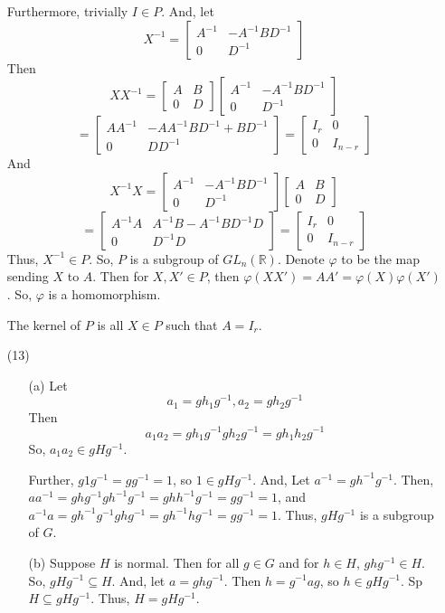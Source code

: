 \documentclass[12pt]{article}
\begin{document}
\begin{itemize}
Furthermore, trivially $I \in P$. And, let
$$X^{-1} = \begin{bmatrix}
A^{-1} & -A^{-1}BD^{-1}\\
0 & D^{-1}
\end{bmatrix}$$
Then
$$XX^{-1} = \begin{bmatrix}
A & B \\
0 & D
\end{bmatrix}\begin{bmatrix}
A^{-1} & -A^{-1}BD^{-1}\\
0 & D^{-1}
\end{bmatrix}$$
$$= \begin{bmatrix}
AA^{-1} & -AA^{-1}BD^{-1} + BD^{-1} \\
0 & DD^{-1} 
\end{bmatrix} = \begin{bmatrix}
I_r & 0 \\
0 & I_{n-r}
\end{bmatrix}$$
And
$$X^{-1}X = \begin{bmatrix}
A^{-1} & -A^{-1}BD^{-1}\\
0 & D^{-1}
\end{bmatrix}\begin{bmatrix}
A & B \\
0 & D
\end{bmatrix}$$
$$= \begin{bmatrix}
A^{-1}A & A^{-1}B - A^{-1}BD^{-1}D \\
0 & D^{-1}D
\end{bmatrix} = \begin{bmatrix}
I_r & 0 \\
0 & I_{n-r}
\end{bmatrix}$$
Thus, $X^{-1} \in P$. So, $P$ is a subgroup of $GL_n(\mathbb{R})$.
Denote $\varphi$ to be the map sending $X$ to $A$. Then for $X, X' \in P$, then $\varphi(XX') = AA' = \varphi(X)\varphi(X')$. So, $\varphi$ is a homomorphism.

The kernel of $P$ is all $X \in P$ such that $A = I_r$.
\item[(13)]
\begin{itemize}
\item[(a)]
Let
$$a_1 = gh_1g^{-1}, a_2 = gh_2g^{-1}$$
Then
$$a_1a_2 = gh_1g^{-1}gh_2g^{-1} = gh_1h_2g^{-1}$$
So, $a_1a_2 \in gHg^{-1}$. 

Further, $g1g^{-1} = gg^{-1} = 1$, so $1 \in gHg^{-1}$. And, Let $a^{-1} = gh^{-1}g^{-1}$. Then, $aa^{-1} = ghg^{-1}gh^{-1}g^{-1} = ghh^{-1}g^{-1} = gg^{-1} = 1$, and $a^{-1}a = gh^{-1}g^{-1}ghg^{-1} = gh^{-1}hg^{-1} = gg^{-1} = 1$. Thus, $gHg^{-1}$ is a subgroup of $G$.
\item[(b)]
Suppose $H$ is normal. Then for all $g \in G$ and for $h \in H$, $ghg^{-1} \in H$. So, $gHg^{-1} \subseteq H$. And, let $a = ghg^{-1}$. Then $h = g^{-1}ag$, so $h \in gHg^{-1}$. Sp $H \subseteq gHg^{-1}$. Thus, $H = gHg^{-1}$.


\end{itemize}
\end{itemize}
\end{document}

